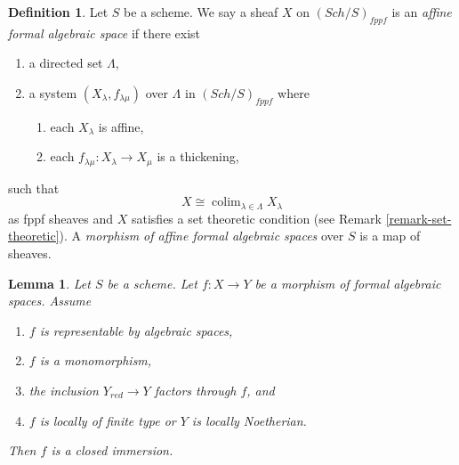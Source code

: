 \documentclass{stacks-project}
\theoremstyle{plain}
\newtheorem{lemma}[subsection]{Lemma}
\theoremstyle{definition}
\newtheorem{definition}[subsection]{Definition}
\theoremstyle{remark}
\numberwithin{equation}{subsection}
\def\colim{\mathop{\mathrm{colim}}\nolimits}
\def\Sch{\mathit{Sch}}
\begin{document}
\begin{definition}
\label{definition-affine-formal-algebraic-space}
Let $S$ be a scheme. We say a sheaf $X$ on $(\Sch/S)_{fppf}$ is an
{\it affine formal algebraic space} if there exist
\begin{enumerate}
\item a directed set $\Lambda$,
\item a system $(X_\lambda, f_{\lambda \mu})$ over $\Lambda$
in $(\Sch/S)_{fppf}$ where
\begin{enumerate}
\item each $X_\lambda$ is affine,
\item each $f_{\lambda \mu} : X_\lambda \to X_\mu$ is a thickening,
\end{enumerate}
\end{enumerate}
such that
$$
X \cong \colim_{\lambda \in \Lambda} X_\lambda
$$
as fppf sheaves and $X$ satisfies a set theoretic condition
(see Remark \ref{remark-set-theoretic}). A
{\it morphism of affine formal algebraic spaces}
over $S$ is a map of sheaves.
\end{definition}

\begin{lemma}
\label{lemma-monomorphism-iso-over-red}
Let $S$ be a scheme. Let $f : X \to Y$ be a morphism of formal algebraic
spaces. Assume
\begin{enumerate}
\item $f$ is representable by algebraic spaces,
\item $f$ is a monomorphism,
\item the inclusion $Y_{red} \to Y$ factors through $f$, and
\item $f$ is locally of finite type or $Y$ is locally Noetherian.
\end{enumerate}
Then $f$ is a closed immersion.
\end{lemma}
\end{document}
